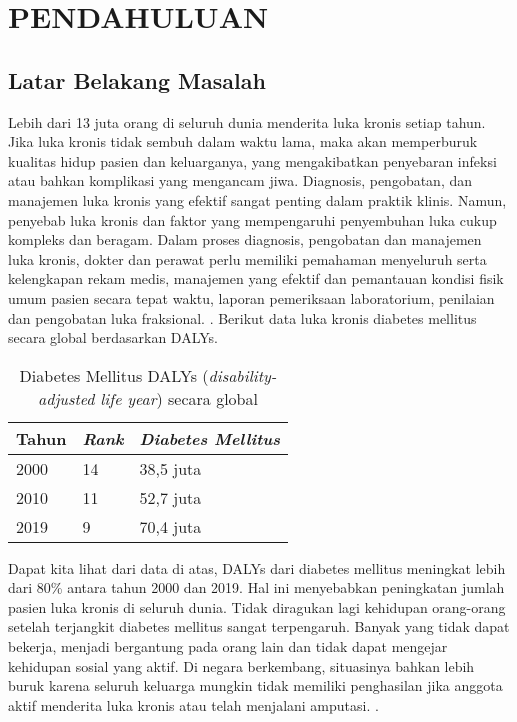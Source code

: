 
\chapter{PENDAHULUAN}

\section{Latar Belakang Masalah}

Lebih dari 13 juta orang di seluruh dunia menderita luka kronis setiap tahun. Jika luka kronis tidak sembuh dalam waktu lama, maka akan memperburuk kualitas hidup pasien dan keluarganya, yang mengakibatkan penyebaran infeksi atau bahkan komplikasi yang mengancam jiwa. Diagnosis, pengobatan, dan manajemen luka kronis yang efektif sangat penting dalam praktik klinis. Namun, penyebab luka kronis dan faktor yang mempengaruhi penyembuhan luka cukup kompleks dan beragam. Dalam proses diagnosis, pengobatan dan manajemen luka kronis, dokter dan perawat perlu memiliki pemahaman menyeluruh serta kelengkapan rekam medis, manajemen yang efektif dan pemantauan kondisi fisik umum pasien secara tepat waktu, laporan pemeriksaan laboratorium, penilaian dan pengobatan luka fraksional. \citep{wang2018new}. Berikut data luka kronis diabetes mellitus secara global berdasarkan DALYs.

\begin{table}[H]
	\caption{Diabetes Mellitus DALYs (\textit{disability-adjusted life year}) secara global \citep{worldhealthorganization}}
	\label{diabetes_mellitus}\begin{center}
	\begin{tabular}{@{} |p{3cm}|p{2cm}|p{7cm}| @{}}
		\hline
		\textbf{Tahun} & \textbf{\textit{Rank}} & \textbf{\textit{Diabetes Mellitus}} \\
		\hline
		2000 & 14 & 38,5 juta \\
		\hline
		2010 & 11 & 52,7 juta \\
		\hline
		2019 & 9 & 70,4 juta \\
		\hline
	\end{tabular}
	\end{center}
\end{table}

Dapat kita lihat dari data di atas, DALYs dari diabetes mellitus meningkat lebih dari 80\% antara tahun 2000 dan 2019. Hal ini menyebabkan peningkatan jumlah pasien luka kronis di seluruh dunia. Tidak diragukan lagi kehidupan orang-orang setelah terjangkit diabetes mellitus sangat terpengaruh. Banyak yang tidak dapat bekerja, menjadi bergantung pada orang lain dan tidak dapat mengejar kehidupan sosial yang aktif. Di negara berkembang, situasinya bahkan lebih buruk karena seluruh keluarga mungkin tidak memiliki penghasilan jika anggota aktif menderita luka kronis atau telah menjalani amputasi. \citep{setacci2020focusing}.

